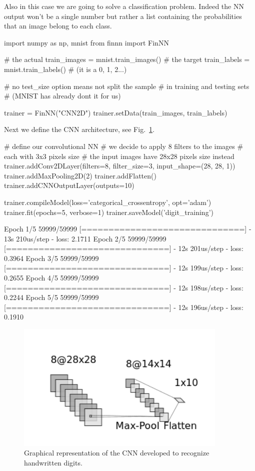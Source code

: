 Also in this case we are going to solve a classification problem. Indeed the NN output won't be a single number but rather a list containing the probabilities that an image belong to each class.

\begin{ipython}
import numpy as np, mnist
from finnn import FinNN

# the actual
train_images = mnist.train_images()
# the target
train_labels = mnist.train_labels() # (it is a 0, 1, 2...)

# no test_size option means not split the sample
# in training and testing sets
# (MNIST has already dont it for us)

trainer = FinNN("CNN2D")
trainer.setData(train_images, train_labels)
\end{ipython}
\noindent
Next we define the CNN architecture, see Fig.~\ref{fig:cnn2d}.

\begin{ipython}
# define our convolutional NN
# we decide to apply 8 filters to the images
# each with 3x3 pixels size
# the input images have 28x28 pixels size instead
trainer.addConv2DLayer(filters=8, filter_size=3, input_shape=(28, 28, 1))
trainer.addMaxPooling2D(2)
trainer.addFlatten()
trainer.addCNNOutputLayer(outputs=10)

trainer.compileModel(loss='categorical_crossentropy', opt='adam')
trainer.fit(epochs=5, verbose=1)
trainer.saveModel('digit_training')
\end{ipython}
\begin{ioutput}
Epoch 1/5
59999/59999 [==============================] - 13s 210us/step - loss: 2.1711
Epoch 2/5
59999/59999 [==============================] - 12s 201us/step - loss: 0.3964
Epoch 3/5
59999/59999 [==============================] - 12s 199us/step - loss: 0.2655
Epoch 4/5
59999/59999 [==============================] - 12s 198us/step - loss: 0.2244
Epoch 5/5
59999/59999 [==============================] - 12s 196us/step - loss: 0.1910
\end{ioutput}

\begin{figure}[htb]
\centering
\includegraphics[width=0.9\textwidth]{figures/cnn_2d.png}
\caption{Graphical representation of the CNN developed to recognize handwritten digits.}
    \label{fig:cnn2d}
\end{figure}


